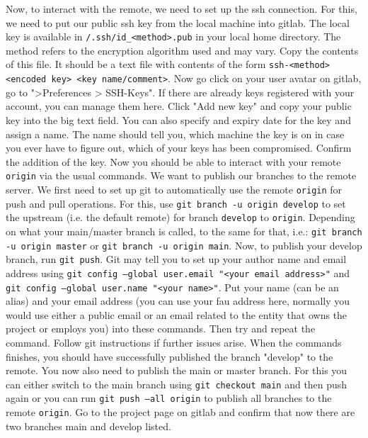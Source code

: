 \documentclass[]{erlangen-problemset}
\begin{document}
\begin{problem}[title={Dealing with remotes}]
\Question Now, to interact with the remote, we need to set up the ssh connection. For this, we need to put our public ssh key from the local machine into gitlab. 
The local key is available in \texttt{\tilde{}/.ssh/id_<method>.pub} in your local home directory. The method refers to the encryption algorithm used and may vary. 
Copy the contents of this file. It should be a text file with contents of the form \texttt{ssh-<method> <encoded key> <key name/comment>}. 
Now go click on your user avatar on gitlab, go to ">Preferences > SSH-Keys". If there are already keys registered with your account, you can manage them here.
Click "Add new key" and copy your public key into the big text field. You can also specify and expiry date for the key and assign a name. 
The name should tell you, which machine the key is on in case you ever have to figure out, which of your keys has been compromised. 
Confirm the addition of the key. 
Now you should be able to interact with your remote \texttt{origin} via the usual commands.
\Question We want to publish our branches to the remote server. We first need to set up git to automatically use the remote \texttt{origin} for push and pull operations. 
For this, use \texttt{git branch -u origin develop} to set the upstream (i.e. the default remote) for branch \texttt{develop} to \texttt{origin}.
Depending on what your main/master branch is called, to the same for that, i.e.: \texttt{git branch -u origin master} or \texttt{git branch -u origin main}.
Now, to publish your develop branch, run \texttt{git push}. 
Git may tell you to set up your author name and email address using \texttt{git config --global user.email "<your email address>"} and \texttt{git config --global user.name "<your name>"}. 
Put your name (can be an alias) and your email address (you can use your fau address here, normally you would use either a public email or an email related to the entity that owns the project or employs you) into these commands.
Then try and repeat the command. 
Follow git instructions if further issues arise. 
When the commands finishes, you should have successfully published the branch "develop" to the remote. 
You now also need to publish the main or master branch. For this you can either switch to the main branch using \texttt{git checkout main} and then push again or you can run \texttt{git push --all origin} to publish all branches to the remote \texttt{origin}.
\Question Go to the project page on gitlab and confirm that now there are two branches main and develop listed. 
\end{problem}
\end{document}
